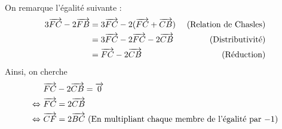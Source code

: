 \documentclass{controle}
\begin{document}
\begin{questions}
\begin{solution}
On remarque l'égalité suivante :
\begin{equation*}
\begin{aligned}
3\overrightarrow{FC} - 2\overrightarrow{FB} &= 3\overrightarrow{FC} - 2(\overrightarrow{FC} + \overrightarrow{CB})&\text{~(Relation de Chasles)}\\
&= 3\overrightarrow{FC} -2\overrightarrow{FC} -2\overrightarrow{CB} &\text{~(Distributivité)}\\
&= \overrightarrow{FC} -2\overrightarrow{CB} &\text{~(Réduction)}
\end{aligned}
\end{equation*}
Ainsi, on cherche
\begin{equation*}
\begin{aligned}
&~\overrightarrow{FC} - 2\overrightarrow{CB} = \overrightarrow{0}\\
\Leftrightarrow& ~\overrightarrow{FC} = 2\overrightarrow{CB}\\
\Leftrightarrow& ~\overrightarrow{CF} = 2\overrightarrow{BC}\text{~(En multipliant chaque membre de l'égalité par $-1$)}
\end{aligned}
\end{equation*}
\end{solution}
\end{questions}
\end{document}

